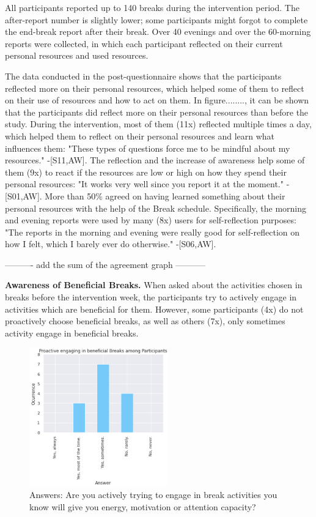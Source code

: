 \documentclass{hasel_thesis}
\begin{document}
All participants reported up to 140 breaks during the intervention period.  The after-report number is slightly lower; some participants might forgot to complete the end-break report after their break.  Over 40 evenings and over the 60-morning reports were collected, in which each participant reflected on their current personal resources and used resources.  

The data conducted in the post-questionnaire shows that the participants reflected more on their personal resources, which helped some of them to reflect on their use of resources and how to act on them.  In figure........, it can be shown that the participants did reflect more on their personal resources than before the study.  During the intervention, most of them (11x) reflected multiple times a day, which helped them to reflect on their personal resources and learn what influences them: "These types of questions force me to be mindful about my resources." -[S11,AW]. The reflection and the increase of awareness help some of them (9x) to react if the resources are low or high on how they spend their personal resources: "It works very well since you report it at the moment." - [S01,AW]. More than 50\% agreed on having learned something about their personal resources with the help of the Break schedule.  Specifically, the morning and evening reports were used by many (8x) users for self-reflection purposes: "The reports in the morning and evening were really good for self-reflection on how I felt, which I barely ever do otherwise." -[S06,AW]. 

---------- add the sum of the agreement graph -----------



\textbf{Awareness of Beneficial Breaks.} \label{beneficial_breaks}
When asked about the activities chosen in breaks before the intervention week, the participants try to actively engage in activities which are beneficial for them. However, some participants (4x) do not proactively choose beneficial breaks, as well as others (7x), only sometimes activity engage in beneficial breaks. 

\begin{figure}[htp]
    \centering
    \includegraphics[width=6cm]{hasel_thesis/images/proactive_engaging.png}
    \caption{Answers: Are you actively trying to engage in break activities you know will give you energy, motivation or attention capacity?}
    \label{fig:proactive_breaks}
\end{figure}
\end{document}
